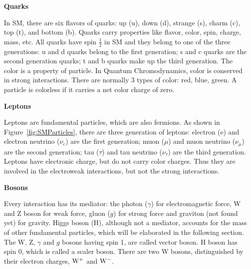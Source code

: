 {\bf Quarks}

In SM, there are six flavors of quarks: up (u), down (d), strange (s), charm (c), top (t), and bottom (b).  
Quarks carry properties like flavor, color, spin, charge, mass, etc. All quarks have spin $\frac{1}{2}$ in SM and they belong to one of the three generations: u and d quarks belong to the first generation; s and c quarks are the second generation quarks; t and b quarks 
make up the third generation. %
The color is a property of particle. In Quantum Chromodynamics, color is conserved in strong interactions. 
There are normally 3 types of color: red, blue, green. A particle is colorless if it carries a net color 
charge of zero. 
  

{\bf Leptons}

Leptons are fundamental particles, which are also fermions. 
As shown in Figure~\ref{fig:SMParticles}, there are three generation of leptons: electron (e) and electron neutrino ($\nu_e$) are the first generation; 
muon ($\mu$) and muon neutrino ($\nu_\mu$) are the second generation; 
tau ($\tau$) and tau neutrino ($\nu_\tau$) are the third generation.  Leptons 
have electronic charge,  but do not 
carry color charges. Thus they are involved in the electroweak interactions, but not the
strong interactions. 

{\bf Bosons}

Every interaction has its mediator: the photon ($\gamma$) for electromagnetic force,  W and Z boson for weak force, gluon ($g$) for strong force and 
graviton (not found yet) for gravity. Higgs boson (H), although not a mediator, 
accounts for the mass of other fundamental particles, which will be elaborated in the following section. 
The W, Z, $\gamma$ and $g$ bosons having spin 1, are called vector boson. H boson has spin 0, which is called a scaler boson. 
There are two W bosons, distinguished by their electron charges,  ${\rm W^+}$ and ${\rm W^-}$. 






